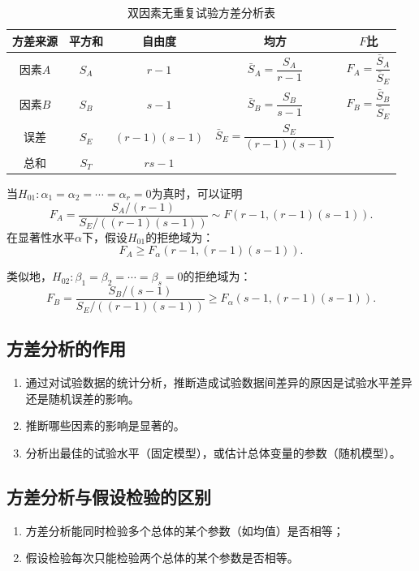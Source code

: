 \documentclass[11pt,a4paper]{report}
\theoremstyle{definition}
\begin{document}
\begin{table}[htbp]
\centering
\caption{双因素无重复试验方差分析表}
\begin{tabular}{@{}ccccc@{}}
\toprule
\textbf{方差来源} & \textbf{平方和} & \textbf{自由度} & \textbf{均方} & \textbf{$F$比} \\
\midrule
因素$A$ & $S_{A}$ & $r-1$ & $\bar{S}_{A}=\dfrac{S_{A}}{r-1}$ & $F_{A}=\dfrac{\bar{S}_{A}}{\bar{S}_{E}}$ \\[0.8em]
因素$B$ & $S_{B}$ & $s-1$ & $\bar{S}_{B}=\dfrac{S_{B}}{s-1}$ & $F_{B}=\dfrac{\bar{S}_{B}}{\bar{S}_{E}}$ \\[0.8em]
误差 & $S_{E}$ & $(r-1)(s-1)$ & $\bar{S}_{E}=\dfrac{S_{E}}{(r-1)(s-1)}$ & \\[0.8em]
总和 & $S_{T}$ & $rs-1$ & & \\
\bottomrule
\end{tabular}
\end{table}

当$H_{01}\colon\alpha_{1}=\alpha_{2}=\cdots=\alpha_{r}=0$为真时，可以证明
\[
F_{A}=\frac{S_{A}/(r-1)}{S_{E}/((r-1)(s-1))}\sim F(r-1,(r-1)(s-1)).
\]
在显著性水平$\alpha$下，假设$H_{01}$的拒绝域为：
\[
F_{A}\geq F_{\alpha}(r-1,(r-1)(s-1)).
\]

类似地，$H_{02}\colon\beta_{1}=\beta_{2}=\cdots=\beta_{s}=0$的拒绝域为：
\[
F_{B}=\frac{S_{B}/(s-1)}{S_{E}/((r-1)(s-1))}\geq F_{\alpha}(s-1,(r-1)(s-1)).
\]

\subsection{方差分析的作用}

\begin{enumerate}[label=\arabic*.,leftmargin=2em]
    \item 通过对试验数据的统计分析，推断造成试验数据间差异的原因是试验水平差异还是随机误差的影响。
    \item 推断哪些因素的影响是显著的。
    \item 分析出最佳的试验水平（固定模型），或估计总体变量的参数（随机模型）。
\end{enumerate}

\subsection{方差分析与假设检验的区别}

\begin{enumerate}[label=\arabic*.,leftmargin=2em]
    \item 方差分析能同时检验多个总体的某个参数（如均值）是否相等；
    \item 假设检验每次只能检验两个总体的某个参数是否相等。
\end{enumerate}
\end{document}
